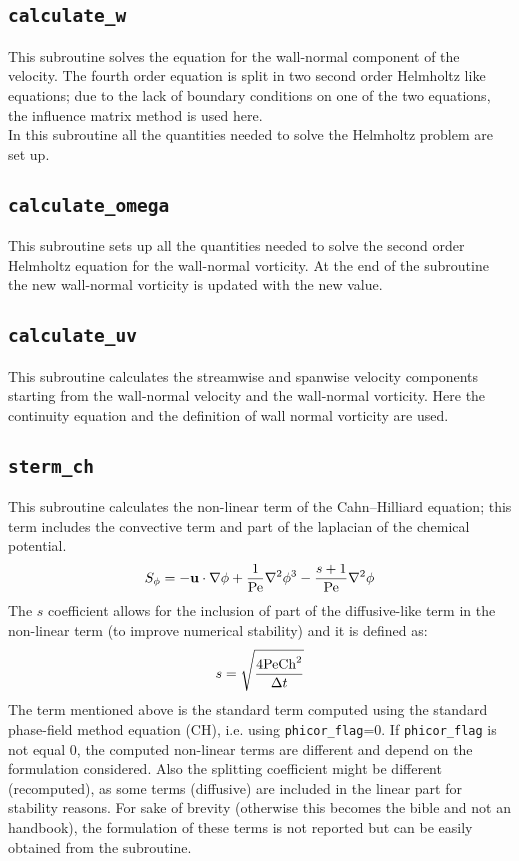 \subsection{\texttt{calculate\_w}}
This subroutine solves the equation for the wall-normal component of the velocity. The fourth order equation is split in two second order Helmholtz like equations; due to the lack of boundary conditions on one of the two equations, the influence matrix method is used here.\\
In this subroutine all the quantities needed to solve the Helmholtz problem are set up.

\subsection{\texttt{calculate\_omega}}
This subroutine sets up all the quantities needed to solve the second order Helmholtz equation for the wall-normal vorticity. At the end of the subroutine the new wall-normal vorticity is updated with the new value.

\subsection{\texttt{calculate\_uv}}
This subroutine calculates the streamwise and spanwise velocity components starting from the wall-normal velocity and the wall-normal vorticity. Here the continuity equation and the definition of wall normal vorticity are used.

\subsection{\texttt{sterm\_ch}}
This subroutine calculates the non-linear term of the Cahn--Hilliard equation; this term includes the convective term and part of the laplacian of the chemical potential. 
\[
S_\phi=-\mathbf{u}\cdot\nabla\phi+\frac{1}{\textnormal{Pe}}\nabla^2\phi^3-\frac{s+1}{\textnormal{Pe}}\nabla^2\phi
\]
The $s$ coefficient allows for the inclusion of part of the diffusive-like term in the non-linear term (to improve numerical stability) and it is defined as:
\[
s=\sqrt{\frac{4\textnormal{Pe}\textnormal{Ch}^2}{\Delta t}}
\]
The term mentioned above is the standard term computed using the standard phase-field method equation (CH), i.e. using \texttt{phicor\_flag}=0.
If \texttt{phicor\_flag} is not equal 0, the computed non-linear terms are different and depend on the formulation considered.
Also the splitting coefficient might be different (recomputed), as some terms (diffusive) are included in the linear part for stability reasons.
For sake of brevity (otherwise this becomes the bible and not an handbook), the formulation of these terms is not reported but can be easily obtained from the subroutine. 

